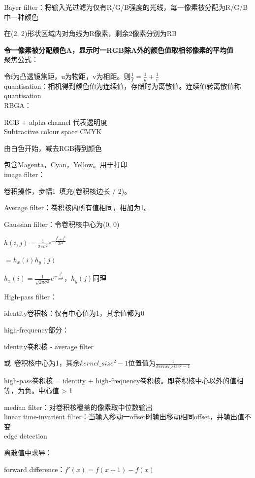 \documentclass[UTF8]{ctexart}
\begin{document}
  Bayer filter：将输入光过滤为仅有R/G/B强度的光线，每一像素被分配为R/G/B中一种颜色

  \quad 在(2, 2)形状区域内对角线为R像素，剩余2像素分别为RB

  \textbf{令一像素被分配颜色A，显示时一RGB除A外的颜色值取相邻像素的平均值}\\
聚焦公式：

  令f为凸透镜焦距，u为物距，v为相距。则$\frac{1}{f} = \frac{1}{u} + \frac{1}{v}$\\
quantisation：相机得到颜色值为连续值，存储时为离散值。连续值转离散值称quantisation\\
RBGA：

  RGB + alpha channel 代表透明度\\
Subtractive colour space CMYK

  由白色开始，减去RGB得到颜色

  包含Magenta，Cyan，Yellow。用于打印\\
image filter：

  卷积操作，步幅1\ 填充(卷积核边长 / 2)。
  
  Average filter：卷积核内所有值相同，相加为1。

  Gaussian filter：令卷积核中心为(0, 0)

  \quad $h(i, j) = \frac{1}{2\pi\sigma^2}e^{-\frac{i^2+j^2}{2\sigma^2}}$

  \quad \quad $ = h_x(i) h_y(j)$

  \quad \quad $h_x(i) = \frac{1}{\sqrt{2\pi\sigma^2}}e^{-\frac{i^2}{2\sigma^2}}$，$h_y(j)$同理
  
  High-pass filter：

  \quad identity卷积核：仅有中心值为1，其余值都为0

  \quad high-frequency部分：
  
  \quad \quad identity卷积核 - average filter

  \quad \quad 或\ 卷积核中心为1，其余$kernel\_size^2 - 1$位置值为$\frac{1}{kernel\_size^2 - 1}$

  \quad high-pass卷积核 = identity + high-frequency卷积核。即卷积核中心以外的值相等，为负。中心值 > 1

  median filter：对卷积核覆盖的像素取中位数输出\\
linear time-invarient filter：当输入移动一offset时输出移动相同offset，并输出值不变\\
edge detection

  离散值中求导：
  
  \quad forward difference：$f'(x) = f(x + 1) - f(x)$
\end{document}
